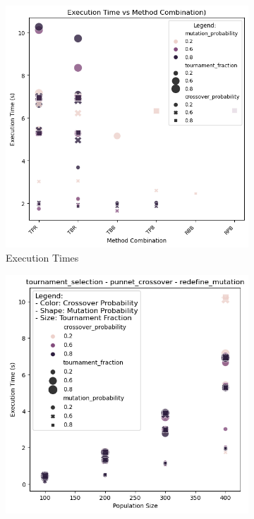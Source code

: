 \documentclass[11pt,a4paper,twoside]{article}
\begin{document}
\begin{figure}[H]
    \centering
    \begin{subfigure}[b]{0.45\textwidth}
        \centering
        \includegraphics[width=\textwidth]{execution_time.png}
        \caption{Execution Times}
        \label{fig:Pop_sizes}
    \end{subfigure}
    \hfill
    \begin{subfigure}[b]{0.45\textwidth}
        \centering
        \includegraphics[width=\textwidth]{TPR_example.png}

\end{subfigure}
\end{figure}
\end{document}
